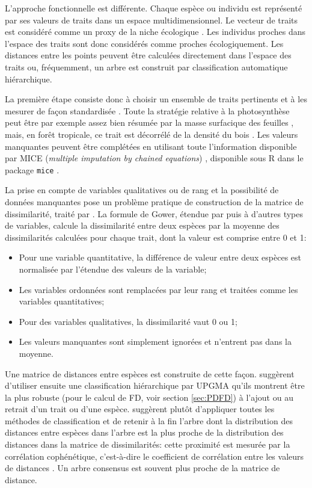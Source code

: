 \documentclass[
  11pt,
  french,
  a4paper,
  extrafontsizes,onecolumn,openright
  ]{memoir}
\providecommand{\tightlist}{%
  \setlength{\itemsep}{0pt}\setlength{\parskip}{0pt}}
\newlength{\rf}
\begin{document}
L'approche fonctionnelle est différente.
Chaque espèce ou individu est représenté par ses valeurs de traits dans un espace multidimensionnel.
Le vecteur de traits est considéré comme un proxy de la niche écologique \autocite{Westoby2002}.
Les individus proches dans l'espace des traits sont donc considérés comme proches écologiquement.
Les distances entre les points peuvent être calculées directement dans l'espace des traits ou, fréquemment, un arbre est construit par classification automatique hiérarchique.

La première étape consiste donc à choisir un ensemble de traits pertinents et à les mesurer de façon standardisée \autocite{Cornelissen2003}.
Toute la stratégie relative à la photosynthèse peut être par exemple assez bien résumée par la masse surfacique des feuilles \autocite{Wright2004}, mais, en forêt tropicale, ce trait est décorrélé de la densité du bois \autocite{Baraloto2010}.
Les valeurs manquantes peuvent être complétées en utilisant toute l'information disponible par MICE (\emph{multiple imputation by chained equations}) \autocite{VanBuuren2006}, disponible sous R dans le package \texttt{mice} \autocite{VanBuuren2011}.

La prise en compte de variables qualitatives ou de rang et la possibilité de données manquantes pose un problème pratique de construction de la matrice de dissimilarité, traité par \textcite{Gower1971}.
La formule de Gower, étendue par \textcite{Podani1999} puis \textcite{Pavoine2009b} à d'autres types de variables, calcule la dissimilarité entre deux espèces par la moyenne des dissimilarités calculées pour chaque trait, dont la valeur est comprise entre 0 et 1:

\begin{itemize}
\tightlist
\item
  Pour une variable quantitative, la différence de valeur entre deux espèces est normalisée par l'étendue des valeurs de la variable;
\item
  Les variables ordonnées sont remplacées par leur rang et traitées comme les variables quantitatives;
\item
  Pour des variables qualitatives, la dissimilarité vaut 0 ou 1;
\item
  Les valeurs manquantes sont simplement ignorées et n'entrent pas dans la moyenne.
\end{itemize}

Une matrice de distances entre espèces est construite de cette façon.
\textcite{Podani2006} suggèrent d'utiliser ensuite une classification hiérarchique par UPGMA \autocite{Sokal1958} qu'ils montrent être la plus robuste (pour le calcul de FD, voir section \ref{sec:PDFD}) à l'ajout ou au retrait d'un trait ou d'une espèce.
\textcite{Mouchet2008} suggèrent plutôt d'appliquer toutes les méthodes de classification et de retenir à la fin l'arbre dont la distribution des distances entre espèces dans l'arbre est la plus proche de la distribution des distances dans la matrice de dissimilarités: cette proximité est mesurée par la corrélation cophénétique, c'est-à-dire le coefficient de corrélation entre les valeurs de distances \autocite{Sokal1962,Legendre2012}.
Un arbre consensus \autocite{Felsenstein2004} est souvent plus proche de la matrice de distance.
\end{document}
